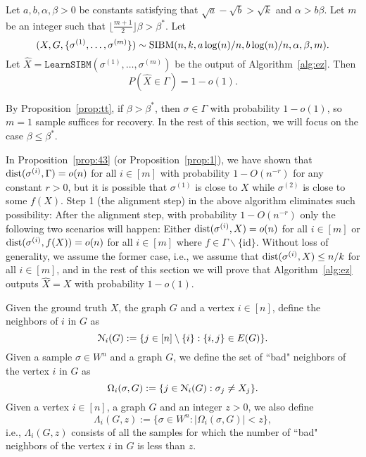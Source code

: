 \documentclass{article}
\begin{document}
\begin{proposition} \label{prop:nr}
	Let $a,b,\alpha,\beta> 0$ be constants satisfying that $\sqrt{a}-\sqrt{b} > \sqrt{k}$ and $\alpha>b\beta$. Let $m$ be an integer such that $\lfloor \frac{m+1}{2} \rfloor \beta>\beta^\ast$.
	Let 
	$$
	(X,G,\{\sigma^{(1)},\dots,\sigma^{(m)}\})\sim \operatorname{SIBM}(n,k, a\log(n)/n, b\log(n)/n,\alpha,\beta, m) .
	$$
	Let $\hat{X}=\texttt{LearnSIBM}(\sigma^{(1)},\dots,\sigma^{(m)})$ be the output of Algorithm~\ref{alg:ez}. Then
	$$
	P(\hat{X} \in \Gamma) = 1-o(1) .
	$$
\end{proposition}

By Proposition~\ref{prop:tt},
if $\beta>\beta^\ast$, then $\sigma \in \Gamma $ with probability $1-o(1)$, so $m=1$ sample suffices for recovery. In the rest of this section, we will focus on the case $\beta\le \beta^\ast$.

In Proposition~\ref{prop:43} (or Proposition~\ref{prop:1}), we have shown that $\operatorname{dist}(\sigma^{(i)}, \Gamma) =o(n)$ for all $i\in[m]$ with probability $1-O(n^{-r})$ for any constant $r>0$, but it is possible that $\sigma^{(1)}$ is close to $X$ while $\sigma^{(2)}$ is close to some $f(X)$. Step 1 (the alignment step) in the above algorithm eliminates such possibility: After the alignment step, with probability $1-O(n^{-r})$ only the following two scenarios will happen: Either
$\operatorname{dist}(\sigma^{(i)}, X)=o(n)$ for all $i\in[m]$ or $\operatorname{dist}(\sigma^{(i)}, f(X))=o(n)$ for all $i\in[m]$ where $f \in \Gamma \backslash \{\textrm{id}\}$. Without loss of generality, we assume the former case, i.e., we assume that 
$\operatorname{dist}(\sigma^{(i)}, X) \le n/k$ for all $i\in[m]$,
and in the rest of this section we will prove that Algorithm~\ref{alg:ez} outputs $\hat{X}=X$ with probability $1-o(1)$.


Given the ground truth $X$, the graph $G$ and a vertex $i\in[n]$, define the neighbors of $i$ in $G$ as 
\begin{equation} \label{eq:ngbi}
\mathcal{N}_i(G) := \{j\in[n]\setminus\{i\}:
\{i,j\}\in E(G) \} .
\end{equation}
Given a sample $\sigma\in W^n$ and a graph $G$,  we define the set of ``bad" neighbors of the vertex $i$ in $G$ as
$$
\Omega_i(\sigma,G):=\{j\in \mathcal{N}_i(G): 
\sigma_j \neq X_j \} .
$$
Given a vertex $i\in[n]$, a graph $G$ and an integer $z>0$, we also define
$$
\Lambda_i(G, z):=\{ \sigma\in W^n: |\Omega_i(\sigma,G)| < z \} ,
$$
i.e., $\Lambda_i(G, z)$ consists of all the samples for which the number of ``bad" neighbors of the vertex $i$ in $G$ is less than $z$.
\end{document}
